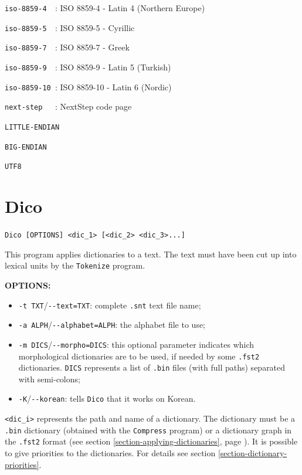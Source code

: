 \verb$iso-8859-4  $: ISO 8859-4  - Latin 4 (Northern Europe)

\verb$iso-8859-5  $: ISO 8859-5  - Cyrillic

\verb$iso-8859-7  $: ISO 8859-7  - Greek

\verb$iso-8859-9  $: ISO 8859-9  - Latin 5 (Turkish)

\verb$iso-8859-10 $: ISO 8859-10 - Latin 6 (Nordic)

\verb$next-step   $: NextStep code page

\verb$LITTLE-ENDIAN$

\verb$BIG-ENDIAN$

\verb$UTF8$







\section{Dico}
\verb+Dico [OPTIONS] <dic_1> [<dic_2> <dic_3>...]+

\bigskip
\noindent This program applies dictionaries to a text. The text must have been cut up into
lexical units by the \verb+Tokenize+ program.

\bigskip
\noindent \textbf{OPTIONS:}
\begin{itemize}
  \item \verb+-t TXT+/\verb+--text=TXT+: complete \verb+.snt+ text file name;
  \item \verb+-a ALPH+/\verb+--alphabet=ALPH+: the alphabet file to use;
  \item \verb+-m DICS+/\verb+--morpho=DICS+: this optional parameter indicates
  which morphological dictionaries are to be used, if needed by some \verb+.fst2+
  dictionaries. \verb+DICS+ represents a list of \verb+.bin+ files (with full
  paths) separated with semi-colons;
  \item \verb+-K+/\verb+--korean+: tells \verb$Dico$ that it works on Korean.
 
\end{itemize}

\bigskip
\noindent
\verb+<dic_i>+ represents the path and name of
a dictionary. The dictionary must be a \verb+.bin+ dictionary (obtained with 
the \verb+Compress+ program) or a dictionary graph in the \verb+.fst2+ format (see section
\ref{section-applying-dictionaries}, page \pageref{section-applying-dictionaries}).
It is possible to give priorities to the dictionaries. For details see 
section \ref{section-dictionary-priorities}.


